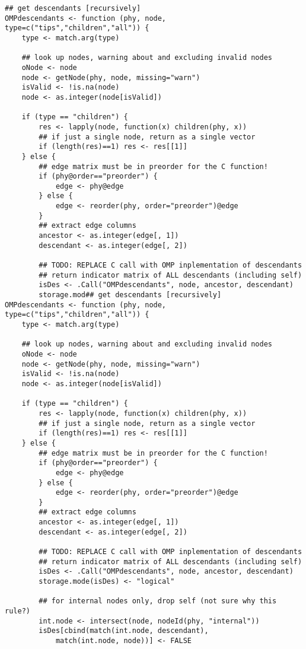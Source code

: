 \documentclass[11pt,letterpaper]{article}
\begin{document}
\begin{lstlisting}[style=MyR]
## get descendants [recursively]
OMPdescendants <- function (phy, node, type=c("tips","children","all")) {
    type <- match.arg(type)

    ## look up nodes, warning about and excluding invalid nodes
    oNode <- node
    node <- getNode(phy, node, missing="warn")
    isValid <- !is.na(node)
    node <- as.integer(node[isValid])

    if (type == "children") {
        res <- lapply(node, function(x) children(phy, x))
        ## if just a single node, return as a single vector
        if (length(res)==1) res <- res[[1]]
    } else {
        ## edge matrix must be in preorder for the C function!
        if (phy@order=="preorder") {
            edge <- phy@edge
        } else {
            edge <- reorder(phy, order="preorder")@edge
        }
        ## extract edge columns
        ancestor <- as.integer(edge[, 1])
        descendant <- as.integer(edge[, 2])
        
        ## TODO: REPLACE C call with OMP inplementation of descendants
        ## return indicator matrix of ALL descendants (including self)
        isDes <- .Call("OMPdescendants", node, ancestor, descendant)
        storage.mod## get descendants [recursively]
OMPdescendants <- function (phy, node, type=c("tips","children","all")) {
    type <- match.arg(type)

    ## look up nodes, warning about and excluding invalid nodes
    oNode <- node
    node <- getNode(phy, node, missing="warn")
    isValid <- !is.na(node)
    node <- as.integer(node[isValid])

    if (type == "children") {
        res <- lapply(node, function(x) children(phy, x))
        ## if just a single node, return as a single vector
        if (length(res)==1) res <- res[[1]]
    } else {
        ## edge matrix must be in preorder for the C function!
        if (phy@order=="preorder") {
            edge <- phy@edge
        } else {
            edge <- reorder(phy, order="preorder")@edge
        }
        ## extract edge columns
        ancestor <- as.integer(edge[, 1])
        descendant <- as.integer(edge[, 2])
        
        ## TODO: REPLACE C call with OMP inplementation of descendants
        ## return indicator matrix of ALL descendants (including self)
        isDes <- .Call("OMPdescendants", node, ancestor, descendant)
        storage.mode(isDes) <- "logical"

        ## for internal nodes only, drop self (not sure why this rule?)
        int.node <- intersect(node, nodeId(phy, "internal"))
        isDes[cbind(match(int.node, descendant),
            match(int.node, node))] <- FALSE
        

\end{lstlisting}
\end{document}
